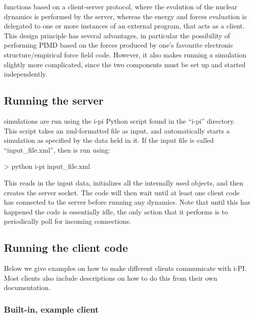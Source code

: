 \documentclass[11pt,english,fleqn]{report}
\newenvironment{code}{%
\footnotesize 
\verbatim
}{
\endverbatim
\normalsize
}
\begin{document}
\ipi functions based on a client-server protocol, where the evolution of the nuclear dynamics
is performed by the \ipi server, whereas the energy and forces evaluation is delegated to 
one or more instances of an external program, that acts as a client. This design principle
has several advantages, in particular the possibility of performing PIMD based on the forces
produced by one's favourite electronic structure/empirical force field code. However, it 
also makes running a simulation slightly more complicated, since the two components
must be set up and started independently.

\subsection{Running the \ipi server}

\label{runningsimulations}

\ipi simulations are run using the i-pi Python script found in the
{}``i-pi'' directory. This script takes an xml-formatted file as
input, and automatically starts a simulation as specified by the data
held in it. If the input file is called {}``input\_file.xml'', then
\ipi is run using:

\begin{code}
> python i-pi input_file.xml
\end{code}

This reads in the input data, initializes all the internally used
objects, and then creates the server socket. The code will then wait
until at least one client code has connected to the server before
running any dynamics. Note that until this has happened the code is
essentially idle, the only action that it performs is to periodically
poll for incoming connections.


\subsection{Running the client code}

\label{runningclients}

Below we give examples on how to make different clients communicate with i-PI.
Most clients also include descriptions on how to do this from their own documentation.

\subsubsection{Built-in, example client}

\label{driver.x}
\end{document}

